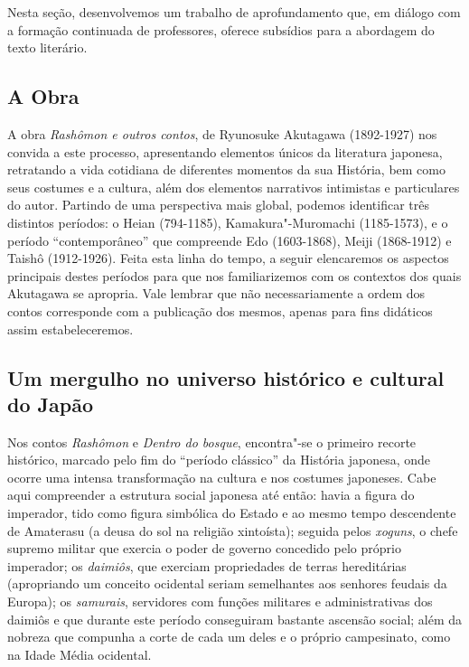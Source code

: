 \documentclass[12pt]{extarticle}
\begin{document}
Nesta seção, desenvolvemos um trabalho de aprofundamento que, em diálogo
com a formação continuada de professores, oferece subsídios para a
abordagem do texto literário.

\subsection{A Obra}

A obra \emph{Rashômon e outros contos}, de Ryunosuke Akutagawa
(1892-1927) nos convida a este processo, apresentando elementos únicos
da literatura japonesa, retratando a vida cotidiana de diferentes
momentos da sua História, bem como seus costumes e a cultura, além dos
elementos narrativos intimistas e particulares do autor. Partindo de uma
perspectiva mais global, podemos identificar três distintos períodos: o
Heian (794-1185), Kamakura"-Muromachi (1185-1573), e o período
``contemporâneo'' que compreende Edo (1603-1868), Meiji (1868-1912) e
Taishô (1912-1926). Feita esta linha do tempo, a seguir elencaremos os
aspectos principais destes períodos para que nos familiarizemos com os
contextos dos quais Akutagawa se apropria. Vale lembrar que não
necessariamente a ordem dos contos corresponde com a publicação dos
mesmos, apenas para fins didáticos assim estabeleceremos.

\subsection{Um mergulho no universo histórico e cultural do Japão}

Nos contos \emph{Rashômon} e \emph{Dentro do bosque}, encontra"-se o
primeiro recorte histórico, marcado pelo fim do ``período clássico'' da
História japonesa, onde ocorre uma intensa transformação na cultura e
nos costumes japoneses. Cabe aqui compreender a estrutura social
japonesa até então: havia a figura do imperador, tido como figura
simbólica do Estado e ao mesmo tempo descendente de Amaterasu (a deusa
do sol na religião xintoísta); seguida pelos \emph{xoguns}, o chefe
supremo militar que exercia o poder de governo concedido pelo próprio
imperador; os \emph{daimiôs}, que exerciam propriedades de terras
hereditárias (apropriando um conceito ocidental seriam semelhantes aos
senhores feudais da Europa); os \emph{samurais}, servidores com funções
militares e administrativas dos daimiôs e que durante este período
conseguiram bastante ascensão social; além da nobreza que compunha a
corte de cada um deles e o próprio campesinato, como na Idade Média
ocidental.
\end{document}
